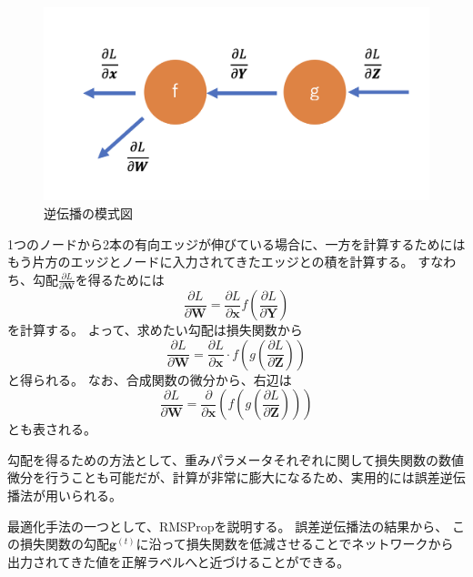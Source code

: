 \begin{enumerate}
\begin{figure}[H]
	\begin{center}
		\includegraphics[width=350pt]{./Figure/DeepLearning/BackProp_back.png}
		\caption[逆伝播の模式図]{逆伝播の模式図}
		\label{BackProp_back}
	\end{center}
\end{figure}

1つのノードから2本の有向エッジが伸びている場合に、一方を計算するためにはもう片方のエッジとノードに入力されてきたエッジとの積を計算する。
すなわち、勾配$\frac{\partial L}{\partial \textbf{W}}$を得るためには
\begin{equation}
\frac{\partial L}{\partial \textbf{W}} = \frac{\partial L}{\partial \textbf{x}} f\left(\frac{\partial L}{\partial \textbf{Y}}\right)
\end{equation}
を計算する。
よって、求めたい勾配は損失関数から
\begin{equation}
\frac{\partial L}{\partial \textbf{W}}= \frac{\partial L}{\partial \textbf{x}}\cdot f\left(g\left(\frac{\partial L}{\partial \textbf{Z}}\right)\right)\end{equation}
と得られる。
なお、合成関数の微分から、右辺は
\begin{equation}
\frac{\partial L}{\partial \textbf{W}} = \frac{\partial }{\partial \textbf{x}}\left(f\left(g\left(\frac{\partial L}{\partial \textbf{Z}}\right)\right)\right)
\end{equation}
とも表される。

勾配を得るための方法として、重みパラメータそれぞれに関して損失関数の数値微分を行うことも可能だが、計算が非常に膨大になるため、実用的には誤差逆伝播法が用いられる。

最適化手法の一つとして、RMSPropを説明する。
誤差逆伝播法の結果から、
この損失関数の勾配$\textbf{g}^{(t)}$に沿って損失関数を低減させることでネットワークから出力されてきた値を正解ラベルへと近づけることができる。


\end{enumerate}
